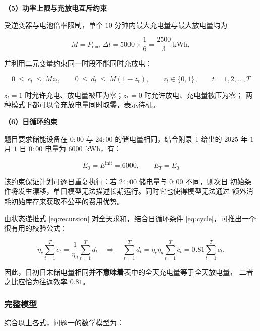 \documentclass[withoutpreface,bwprint]{cumcmthesis}
\begin{document}
\textbf{（5）功率上限与充放电互斥约束}

受逆变器与电池倍率限制，单个 $10$ 分钟内最大充电量与最大放电量均为

\begin{equation}
  M = P_{\max}\,\Delta t = 5000 \times \frac{1}{6} = \frac{2500}{3}\ \text{kWh},
  \label{eq:M}
\end{equation}

并利用二元变量约束同一时段不能同时充放电：

\begin{equation}
  0 \ \le\ c_t \ \le\ M z_t, \qquad
  0 \ \le\ d_t \ \le\ M(1-z_t), \qquad
  z_t \in \{0,1\}, \qquad t = 1,2,\dots,T
  \label{eq:mutex}
\end{equation}

$z_t = 1$ 时允许充电、放电量被压为零；$z_t = 0$ 时允许放电、充电量被压为零；
两种模式下都可以令充放电量同时取零，表示待机。

\textbf{（6）日循环约束}

题目要求储能设备在 $0{:}00$ 与 $24{:}00$ 的储电量相同，结合附录 1 给出的
$2025$ 年 $1$ 月 $1$ 日 $0{:}00$ 电量为 $6000$~kWh，有：

\begin{equation}
  E_0 = E^{\mathrm{init}} = 6000, \qquad E_T = E_0
  \label{eq:cycle}
\end{equation}

该约束保证计划可逐日重复执行：若 $24{:}00$ 储电量与 $0{:}00$ 不同，则次日
初始条件将发生漂移，单日模型无法描述长期运行。同时它也使得模型无法通过
额外消耗初始库存来获取不公平的费用优势。

由状态递推式 \eqref{eq:recursion} 对全天求和，结合日循环条件
\eqref{eq:cycle}，可推出一个很有用的校验公式：

\begin{equation}
  \eta_c \sum_{t=1}^{T} c_t = \frac{1}{\eta_d}\sum_{t=1}^{T} d_t
  \quad\Longrightarrow\quad
  \sum_{t=1}^{T} d_t = \eta_c\eta_d \sum_{t=1}^{T} c_t = 0.81 \sum_{t=1}^{T} c_t .
  \label{eq:cycle-check}
\end{equation}

因此，日初日末储电量相同\textbf{并不意味着}表中的全天充电量等于全天放电量，
二者之比应恰为往返效率 $0.81$。

\subsubsection{完整模型}

综合以上各式，问题一的数学模型为：
\end{document}
